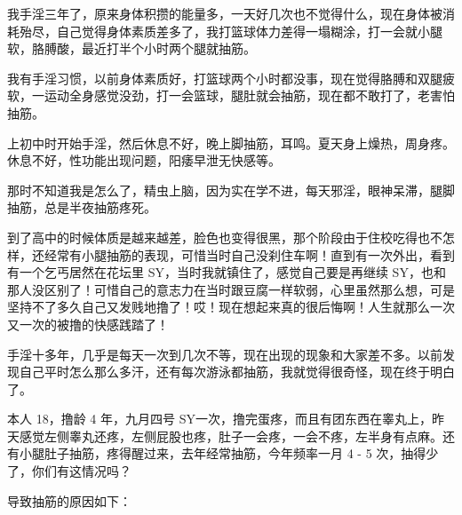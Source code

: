 \begin{case}[抽筋]
    我手淫三年了，原来身体积攒的能量多，一天好几次也不觉得什么，现在身体被消耗殆尽，自己觉得身体素质差多了，我打篮球体力差得一塌糊涂，打一会就小腿软，胳膊酸，最近打半个小时两个腿就抽筋。
\end{case}

\begin{case}[抽筋]
    我有手淫习惯，以前身体素质好，打篮球两个小时都没事，现在觉得胳膊和双腿疲软，一运动全身感觉没劲，打一会篮球，腿肚就会抽筋，现在都不敢打了，老害怕抽筋。
\end{case}

\begin{case}[抽筋]
    上初中时开始手淫，然后休息不好，晚上脚抽筋，耳鸣。夏天身上燥热，周身疼。休息不好，性功能出现问题，阳痿早泄无快感等。
\end{case}

\begin{case}[抽筋]
    那时不知道我是怎么了，精虫上脑，因为实在学不进，每天邪淫，眼神呆滞，腿脚抽筋，总是半夜抽筋疼死。
\end{case}

\begin{case}[抽筋]
    到了高中的时候体质是越来越差，脸色也变得很黑，那个阶段由于住校吃得也不怎样，还经常有小腿抽筋的表现，可惜当时自己没刹住车啊！直到有一次外出，看到有一个乞丐居然在花坛里 SY，当时我就镇住了，感觉自己要是再继续 SY，也和那人没区别了！可惜自己的意志力在当时跟豆腐一样软弱，心里虽然那么想，可是坚持不了多久自己又发贱地撸了！哎！现在想起来真的很后悔啊！人生就那么一次又一次的被撸的快感践踏了！
\end{case}

\begin{case}[抽筋]
    手淫十多年，几乎是每天一次到几次不等，现在出现的现象和大家差不多。以前发现自己平时怎么那么多汗，还有每次游泳都抽筋，我就觉得很奇怪，现在终于明白了。
\end{case}

\begin{case}[抽筋]
    本人 18，撸龄 4 年，九月四号 SY一次，撸完蛋疼，而且有团东西在睾丸上，昨天感觉左侧睾丸还疼，左侧屁股也疼，肚子一会疼，一会不疼，左半身有点麻。还有小腿肚子抽筋，疼得醒过来，去年经常抽筋，今年频率一月 4 - 5 次，抽得少了，你们有这情况吗？
\end{case}

导致抽筋的原因如下：

